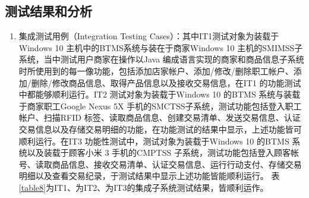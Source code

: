 		\subsection{测试结果和分析}
		\begin{enumerate}

			\item 集成测试用例（Integration Testing Cases）：其中IT1测试对象为装载于Windows 10 主机中的BTMS系统与装在于商家Windows 10 主机的SMIMSS子系统，当中测试用户商家在操作以Java 编成语言实现的商家和商品信息子系统时所使用到的每一像功能，包括添加店家帐户、添加/修改/删除职工帐户、添加/删除/修改商品信息、取得产品信息以及接收交易信息，在IT1 的功能测试中都能够顺利运行。IT2 测试对象为装载于Windows 10 的BTMS 系统与装载于商家职工Google Nexus 5X 手机的SMCTSS子系统，测试功能包括登入职工帐户、扫描RFID 标签、读取商品信息、创建交易清单、发送交易信息、认证交易信息以及存储交易明细的功能，在功能测试的结果中显示，上述功能皆可顺利运行。在IT3 功能性测试中，测试对象为装载于Windows 10 的BTMS 系统以及装载于顾客小米 3 手机的CMPTSS 子系统，测试功能包括登入顾客帐号、读取商品信息、接收交易清单、认证交易信息、运行行动支付、存储交易明细以及查看交易纪录，于测试结果中显示上述功能皆能顺利运行。
			表\ref{table8}为IT1、为IT2、为IT3的集成子系统测试结果，皆顺利运作。


\end{enumerate}
